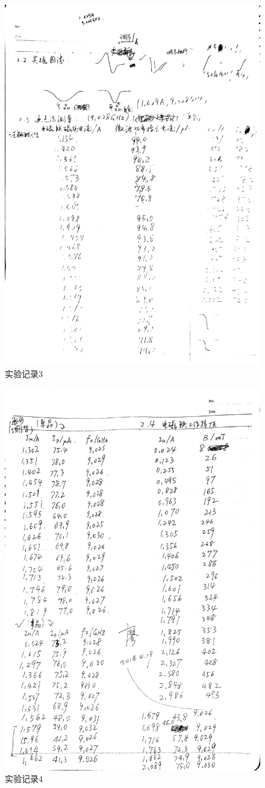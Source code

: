 \begin{figure}[htbp]
	\includegraphics[width=.8\textwidth]{fig/rec/mma/wave3.png}\caption{实验记录3}\label{fig:rec3}
\end{figure}
\begin{figure}[htbp]
	\includegraphics[width=.8\textwidth]{fig/rec/mma/wave4.png}\caption{实验记录4}
\end{figure}